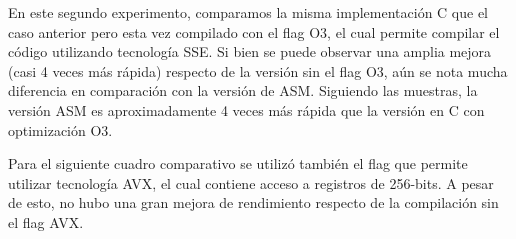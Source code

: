 \documentclass[a4paper]{article}
\begin{document}
\begin{centering}
\end{centering}

En este segundo experimento, comparamos la misma implementación C que el caso anterior pero esta vez compilado con el flag O3,
el cual permite compilar el código utilizando tecnología SSE. Si bien se puede observar una amplia mejora (casi 4 veces más rápida) respecto de la versión
sin el flag O3, aún se nota mucha diferencia en comparación con la versión de ASM. Siguiendo las muestras, la versión ASM es aproximadamente 4 veces más rápida
que la versión en C con optimización O3.
\newline

Para el siguiente cuadro comparativo se utilizó también el flag que permite utilizar tecnología AVX, el cual contiene acceso
a registros de 256-bits. A pesar de esto, no hubo una gran mejora de rendimiento respecto de la compilación sin el flag AVX.
\end{document}
